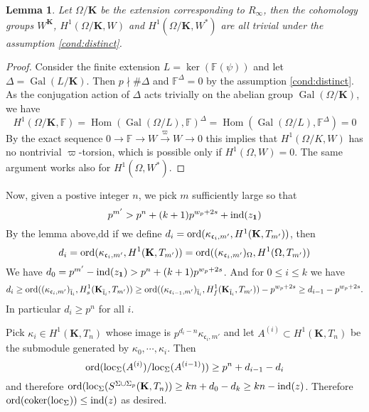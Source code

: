 \documentclass[leqno]{amsart}
\newtheorem{lem}[thm]{Lemma}
\theoremstyle{definition}
\theoremstyle{remark}
\newcommand{\id}{\mathbf{1}}
\newcommand{\fF}{\mathbb{F}} %
\DeclareMathOperator{\Hom}{Hom}
\DeclareMathOperator{\coker}{coker}
\DeclareMathOperator{\Gal}{Gal}
\newcommand{\fc}{\mathfrak{c}}
\newcommand{\fl}{\mathfrak{l}}
\newcommand{\K}{{\mathbf{K}}} %
\newcommand{\flw}{\bar{\fl}}
\newcommand{\ord}{\textnormal{ord}} %
\begin{document}
\begin{lem}
	Let $\Omega/\K$ be the extension corresponding
	to $R_{\infty}$, then the cohomology groups
	$W^\K$, $H^1(\Omega/\K, W)$ and $H^1(\Omega/\K, W^*)$ 
	are all trivial under the assumption \eqref{cond:distinct}.
\end{lem}
\begin{proof}
	Consider the finite extension $L=\ker(\fF(\psi))$
	and let $\Delta=\Gal(L/\K)$.
	Then  $p\nmid \#\Delta$ 
	and $\fF^\Delta=0$ by the assumption  \ref{cond:distinct}.
	As the conjugation action of $\Delta$ acts trivially
	on the abelian group $\Gal(\Omega/\K)$, we have
	\[
		H^1(\Omega/\K,\fF)=
		\Hom(\Gal(\Omega/L),\fF)^\Delta=
		\Hom(\Gal(\Omega/L),\fF^\Delta)=0
	\]
	By the exact sequence
	$0\to\fF\to W\xrightarrow{\varpi}W\to 0$
	this implies that $H^1(\Omega/K,W)$
	has no nontrivial $\varpi$-torsion, 
	which is possible only if  $H^1(\Omega,W)=0$.
	The same argument works also for $H^1(\Omega,W^*)$.
\end{proof}

Now, given a postive integer $n$,
we pick  $m$ sufficiently large so that
\[
p^{m'}> p^n+(k+1)p^{w_p+2s}+\textnormal{ind}(z_{\id})
\]
By the lemma above,dd
if we define $d_i=\ord(\kappa_{\fc_{i},m'}, H^1(\K,T_{m'}))$, then
\[
	d_i=\ord(\kappa_{\fc_{i},m'}, H^1(\K,T_{m'}))=
	\ord( (\kappa_{\fc_{i},m'})_\Omega, H^1(\Omega,T_{m'}))
\]
We have $d_0=p^{m'}-\textnormal{ind}(z_{\id})>p^n+(k+1)p^{w_p+2s}$.
And for $0\leq i\leq k$ we have
\[
	d_i\geq 
	\ord( (\kappa_{\fc_i,m'})_{\flw_i}, H^1_s(\K_{\flw_i}, T_{m'}))\geq
	\ord( (\kappa_{\fc_{i-1},m'})_{\flw_i}, H^1_f(\K_{\flw_i}, T_{m'}))-p^{w_p+2s}\geq 
	d_{i-1}-p^{w_p+2s}.
\]
In particular $d_i\geq p^n$ for all  $i$.

Pick  $\kappa_i\in H^1(\K, T_{n})$ whose image 
is $p^{d_i-n}\kappa_{\fc_i,m'}$
and let $A^{(i)}\subset H^1(\K,T_{n})$
be the submodule generated by $\kappa_0,\cdots,\kappa_i$.
Then 
\[
	\ord(\textnormal{loc}_\Sigma(A^{(i)})/\textnormal{loc}_\Sigma(A^{(i-1)}))
	\geq p^n+d_{i-1}-d_{i}
\]
and therefore
$\ord(\textnormal{loc}_\Sigma(S^{\Sigma\cup \Sigma_p}(\K, T_{n})) 
\geq kn+d_0-d_{k}\geq kn-\textnormal{ind}(z)$.
Therefore $\ord(\coker(\textnormal{loc}_\Sigma))\leq \textnormal{ind}(z)$
as desired.




\end{document}
